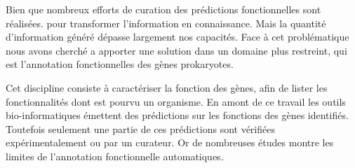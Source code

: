    Bien que nombreux efforts de curation des prédictions fonctionnelles sont réalisées. pour transformer l'information en connaissance. Mais la quantité d'information généré dépasse largement nos capacités. Face à cet problématique nous avons cherché a apporter une solution dans un domaine plus restreint, qui est l'annotation fonctionnelles des gènes prokaryotes.

Cet discipline consiste à caractériser la fonction des gènes, afin de lister les fonctionnalités dont est pourvu un organisme. En amont de ce travail les outils bio-informatiques émettent des prédictions sur les fonctions des gènes identifiés. Toutefois seulement une partie de ces prédictions sont vérifiées expérimentalement ou par un curateur. Or de nombreuses études montre les limites de l'annotation fonctionnelle automatiques. 




